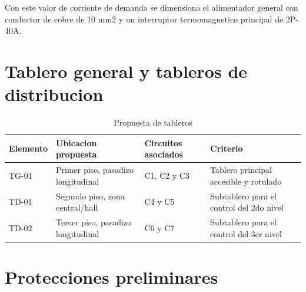 Con este valor de corriente de demanda se dimensiona el alimentador general con conductor de cobre de 10 mm2 y un interruptor termomagnetico principal de 2P-40A.

\section{Tablero general y tableros de distribucion}

\begin{table}[H]
\centering
\small
\caption{Propuesta de tableros}
\label{tab:tableros-distribucion}
\begin{tabularx}{\textwidth}{L{1.8cm}L{4.0cm}L{4.2cm}Y}
\toprule
\textbf{Elemento} & \textbf{Ubicacion propuesta} & \textbf{Circuitos asociados} & \textbf{Criterio} \\
\midrule
TG-01 & Primer piso, pasadizo longitudinal & C1, C2 y C3 & Tablero principal accesible y rotulado \\
TD-01 & Segundo piso, zona central/hall & C4 y C5 & Subtablero para el control del 2do nivel \\
TD-02 & Tercer piso, pasadizo longitudinal & C6 y C7 & Subtablero para el control del 3er nivel \\
\bottomrule
\end{tabularx}
\end{table}

\section{Protecciones preliminares}

